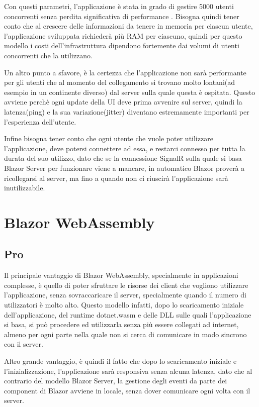 Con questi parametri, l'applicazione \`e stata in grado di gestire 5000 utenti concorrenti senza perdita significativa di performance \cite{blazorModelsScenarios} \cite{bServerConcurrentUsersTest}.
Bisogna quindi tener conto che al crescere delle informazioni da tenere in memoria per ciascun utente, l'applicazione sviluppata richieder\`a pi\`u RAM per ciascuno, quindi per questo modello i costi dell'infrastruttura dipendono fortemente dai volumi di utenti concorrenti che la utilizzano.

Un altro punto a sfavore, \`e la certezza che l'applicazione non sar\`a performante per gli utenti che al momento del collegamento si trovano molto lontani(ad esempio in un continente diverso) dal server sulla quale questa \`e ospitata.
Questo avviene perch\`e ogni update della UI deve prima avvenire sul server, quindi la latenza(ping) e la sua variazione(jitter) diventano estremamente importanti per l'esperienza dell'utente.

Infine bisogna tener conto che ogni utente che vuole poter utilizzare l'applicazione, deve potersi connettere ad essa, e restarci connesso per tutta la durata del suo utilizzo, dato che se la connessione SignalR sulla quale si basa Blazor Server per funzionare viene a mancare, in automatico Blazor prover\`a a ricollegarsi al server, ma fino a quando non ci riuscir\`a l'applicazione sar\`a inutilizzabile.

\pagebreak

\section{Blazor WebAssembly}\label{sez:scalabilitaBWA}
\subsection{Pro}\label{sez:proBWA}
Il principale vantaggio di Blazor WebAssembly, specialmente in applicazioni complesse, \`e quello di poter sfruttare le risorse dei client che vogliono utilizzare l'applicazione, senza sovraccaricare il server, specialmente quando il numero di utilizzatori \`e molto alto.
Questo modello infatti, dopo lo scaricamento iniziale dell'applicazione, del runtime dotnet.wasm e delle DLL sulle quali l'applicazione si basa, si pu\`o procedere ed utilizzarla senza pi\`u essere collegati ad internet, almeno per ogni parte nella quale non si cerca di comunicare in modo sincrono con il server.

Altro grande vantaggio, \`e quindi il fatto che dopo lo scaricamento iniziale e l'inizializzazione, l'applicazione sar\`a responsiva senza alcuna latenza, dato che al contrario del modello Blazor Server, la gestione degli eventi da parte dei component di Blazor avviene in locale, senza dover comunicare ogni volta con il server.

